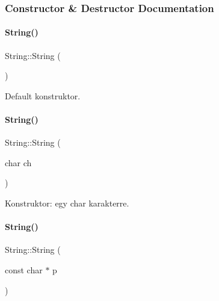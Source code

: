 \subsubsection{Constructor \& Destructor Documentation}
\mbox{\label{class_string_a8a7ef356e05eb9b1ea1ab518baee3095}} 
\paragraph{\texorpdfstring{String()}{String()}\hspace{0.1cm}{\footnotesize\ttfamily [1/4]}}
{\footnotesize\ttfamily String\+::\+String (\begin{DoxyParamCaption}{ }\end{DoxyParamCaption})\hspace{0.3cm}{\ttfamily [inline]}}



Default konstruktor. 

\mbox{\label{class_string_a62a77180f8df2547e8be1313654abcee}} 
\paragraph{\texorpdfstring{String()}{String()}\hspace{0.1cm}{\footnotesize\ttfamily [2/4]}}
{\footnotesize\ttfamily String\+::\+String (\begin{DoxyParamCaption}\item[{char}]{ch }\end{DoxyParamCaption})}



Konstruktor\+: egy char karakterre. 

\mbox{\label{class_string_a09ca4f1436a83ecb1c273a836b7cd4c6}} 
\paragraph{\texorpdfstring{String()}{String()}\hspace{0.1cm}{\footnotesize\ttfamily [3/4]}}
{\footnotesize\ttfamily String\+::\+String (\begin{DoxyParamCaption}\item[{const char $\ast$}]{p }\end{DoxyParamCaption})}



